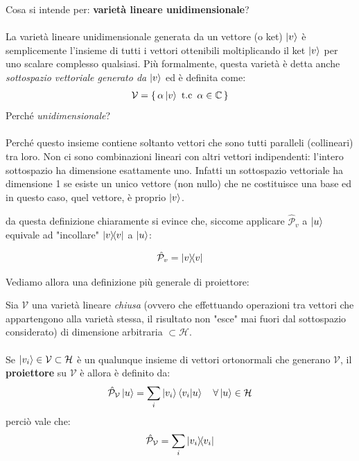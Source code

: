 \begin{myapprf}
	Cosa si intende per: \textbf{varietà lineare unidimensionale}?
	\\
	\\
	La varietà lineare unidimensionale generata da un vettore (o ket) $\ket{v}$ è semplicemente l'insieme di tutti i vettori ottenibili moltiplicando il ket $\ket{v}$ per uno scalare complesso qualsiasi. Più formalmente, questa varietà è detta anche \textit{sottospazio vettoriale generato da $\ket{v}$} ed è definita come:
\begin{align*}
	\mathcal{V} = \qty{ \, \alpha \ket{v} \,\, \text{t.c} \,\,\, \alpha \in \mathbb{C} \,}
\end{align*}
	Perché \textit{unidimensionale}?
	\\
	\\
	Perché questo insieme contiene soltanto vettori che sono tutti paralleli (collineari) tra loro. Non ci sono combinazioni lineari con altri vettori indipendenti: l'intero sottospazio ha dimensione esattamente uno. Infatti un sottospazio vettoriale ha dimensione 1 se esiste un unico vettore (non nullo) che ne costituisce una base ed in questo caso, quel vettore, è proprio $\ket{v}$.
\end{myapprf}
	
	da questa definizione chiaramente si evince che, siccome applicare $\hat{\mathcal{P}}_v$ a $\ket{u}$ equivale ad "incollare" $\ketbra{v}$ a $\ket{u}$:
	
\begin{nb}
\begin{align*}
	\hat{\mathcal{P}}_v = \ketbra{v}
\end{align*}
\end{nb}

	Vediamo allora una definizione più generale di proiettore:
	
\begin{mydef}
	Sia $\mathcal{V}$ una varietà lineare \textit{chiusa} (ovvero che effettuando operazioni tra vettori che appartengono alla varietà stessa, il risultato non "esce" mai fuori dal sottospazio considerato) di dimensione arbitraria $\subset \mathcal{H}$.
	\\
	\\
	Se $\ket{v_i} \in \mathcal{V} \subset \mathcal{H}$ è un qualunque insieme di vettori ortonormali che generano $\mathcal{V}$, il \textbf{proiettore} su $\mathcal{V}$ è allora è definito da:
\begin{align*}
	\hat{\mathcal{P}}_{\mathcal{V}} \ket{u} = \sum_i \ket{v_i} \braket{v_i}{u} \quad \forall \ket{u} \in \mathcal{H}
\end{align*} 
	perciò vale che:
\begin{align*}
	\hat{\mathcal{P}}_{\mathcal{V}} = \sum_i \ketbra{v_i}
\end{align*}
\end{mydef}

